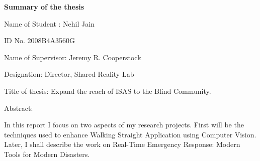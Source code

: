 \begin{center}
\textbf{\large Summary of the thesis}
\end{center}


\begin{flushleft}
Name of Student : Nehil Jain
\end{flushleft}

\begin{flushleft}
ID No. 2008B4A3560G
\end{flushleft}
\begin{flushleft}
Name of Supervisor: Jeremy R. Cooperstock
\end{flushleft}

\begin{flushleft}
Designation: Director, Shared Reality Lab
\end{flushleft}

\begin{flushleft}
Title of thesis: Expand the reach of ISAS to the Blind Community.
\end{flushleft}

\begin{flushleft}
Abstract: 
\end{flushleft}


In this report I focus on two aspects of my research projects. First will be the techniques used to enhance Walking Straight Application using Computer Vision. Later, I shall describe the work on Real-Time Emergency Response: Modern Tools for Modern Disasters.


